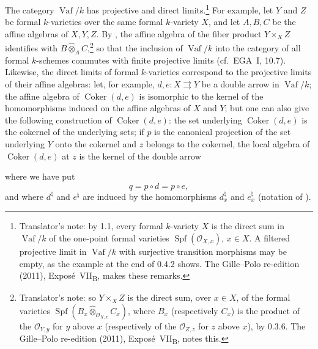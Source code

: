 The category \(\operatorname{Vaf}/k\) has projective and direct
limits.\footnote{Translator's note: by 1.1, every formal \(k\)-variety \(X\) is the direct sum in
\(\operatorname{Vaf}/k\) of the one-point formal varieties \(\operatorname{Spf}(\mathcal O_{X,x})\),
\(x\in X\). A filtered projective limit in \(\operatorname{Vaf}/k\) with surjective transition morphisms
may be empty, as the example at the end of 0.4.2 shows. The Gille--Polo re-edition (2011),
Expos\'e~VII\textsubscript{B}, makes these remarks.} For example, let \(Y\) and \(Z\) be formal
\(k\)-varieties over the same formal \(k\)-variety \(X\), and let
\(A,B,C\) be the affine algebras of \(X,Y,Z\). By , the
affine algebra of the fiber product \(Y\times_X Z\) identifies with
\(B\widehat{\otimes}_A C\),\footnote{Translator's note: so \(Y\times_XZ\) is the direct sum, over
\(x\in X\), of the formal varieties \(\operatorname{Spf}(B_x\widehat\otimes_{\mathcal O_{X,x}}C_x)\),
where \(B_x\) (respectively \(C_x\)) is the product of the \(\mathcal O_{Y,y}\) for \(y\) above \(x\)
(respectively of the \(\mathcal O_{Z,z}\) for \(z\) above \(x\)), by 0.3.6. The Gille--Polo
re-edition (2011), Expos\'e~VII\textsubscript{B}, notes this.} so that the inclusion of
\(\operatorname{Vaf}/k\) into the category of all formal \(k\)-schemes
commutes with finite projective limits (cf.\ EGA~I, 10.7). Likewise,
the direct limits of formal \(k\)-varieties correspond to the projective
limits of their affine algebras:
\label{sga3:VIIB:1.2.C}%
let, for example, \(d,e:X\rightrightarrows Y\) be a double arrow in
\(\operatorname{Vaf}/k\); the affine algebra of
\(\operatorname{Coker}(d,e)\) is isomorphic to the kernel of the
homomorphisms induced on the affine algebras of \(X\) and \(Y\); but
one can also give the following construction of
\(\operatorname{Coker}(d,e)\): the set underlying
\(\operatorname{Coker}(d,e)\) is the cokernel of the underlying sets; if
\(p\) is the canonical projection of the set underlying \(Y\) onto the
cokernel and \(z\) belongs to the cokernel, the local algebra of
\(\operatorname{Coker}(d,e)\) at \(z\) is the kernel of the double
arrow
\begin{center}
  \label{sga3:VIIB:1.2.C-cokernel-double-arrow}
  
\end{center}
where we have put
\[
  q=p\circ d=p\circ e,
\]
and where \(d^\natural\) and \(e^\natural\) are induced by the
homomorphisms \(d_x^\natural\) and \(e_x^\natural\) (notation of
).

